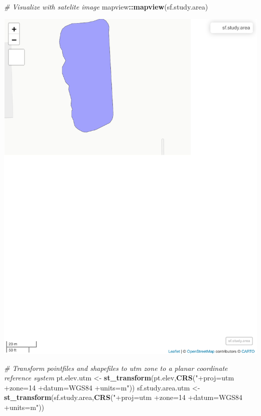 \documentclass[
]{book}
\newenvironment{Shaded}{\begin{snugshade}}{\end{snugshade}}
\newcommand{\CommentTok}[1]{\textcolor[rgb]{0.56,0.35,0.01}{\textit{#1}}}
\newcommand{\FunctionTok}[1]{\textcolor[rgb]{0.13,0.29,0.53}{\textbf{#1}}}
\newcommand{\NormalTok}[1]{#1}
\newcommand{\OtherTok}[1]{\textcolor[rgb]{0.56,0.35,0.01}{#1}}
\newcommand{\SpecialCharTok}[1]{\textcolor[rgb]{0.81,0.36,0.00}{\textbf{#1}}}
\newcommand{\StringTok}[1]{\textcolor[rgb]{0.31,0.60,0.02}{#1}}
\begin{document}
\begin{Shaded}
\begin{Highlighting}[]
\CommentTok{\# Visualize with satelite image }
\NormalTok{mapview}\SpecialCharTok{::}\FunctionTok{mapview}\NormalTok{(sf.study.area)  }
\end{Highlighting}
\end{Shaded}

\includegraphics{_main_files/figure-latex/unnamed-chunk-15-4.pdf}

\begin{Shaded}
\begin{Highlighting}[]
\CommentTok{\# Transform pointfiles and shapefiles to utm zone to a planar coordinate reference system}
\NormalTok{pt.elev.utm }\OtherTok{\textless{}{-}} \FunctionTok{st\_transform}\NormalTok{(pt.elev,}\FunctionTok{CRS}\NormalTok{(}\StringTok{"+proj=utm +zone=14 +datum=WGS84  +units=m"}\NormalTok{))}
\NormalTok{sf.study.area.utm }\OtherTok{\textless{}{-}} \FunctionTok{st\_transform}\NormalTok{(sf.study.area,}\FunctionTok{CRS}\NormalTok{(}\StringTok{"+proj=utm +zone=14 +datum=WGS84  +units=m"}\NormalTok{))}
\end{Highlighting}
\end{Shaded}
\end{document}

